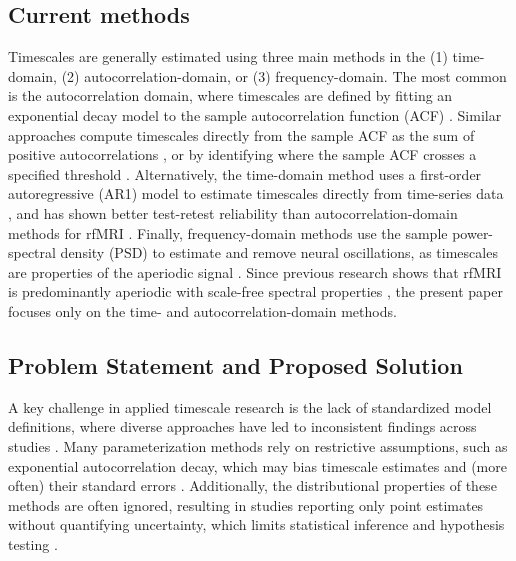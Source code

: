 \documentclass[docs/main.tex]{subfiles}
\begin{document}
\subsection{Current methods}
Timescales are generally estimated using three main methods in the (1) time-domain, (2) autocorrelation-domain, or (3) frequency-domain. The most common is the autocorrelation domain, where timescales are defined by fitting an exponential decay model to the sample autocorrelation function (ACF) \citep{rossi-pool_invariant_2021, cirillo_neural_2018, ito_cortical_2020, runyan_distinct_2017, zeraati_flexible_2022, nougaret_intrinsic_2021, wasmuht_intrinsic_2018, muller_core_2020, maisson_choice-relevant_2021, li_hierarchical_2022, shafiei_topographic_2020}. Similar approaches compute timescales directly from the sample ACF as the sum of positive autocorrelations \citep{wengler_distinct_2020, manea_intrinsic_2022, watanabe_atypical_2019}, or by identifying where the sample ACF crosses a specified threshold \citep{wengler_distinct_2020, zilio_are_2021}. Alternatively, the time-domain method uses a first-order autoregressive (AR1) model to estimate timescales directly from time-series data \citep{kaneoke_variance_2012, meisel_decline_2017, huang_timescales_2018, lurie_cortical_2024, shinn_functional_2023, shafiei_topographic_2020}, and has shown better test-retest reliability than autocorrelation-domain methods for rfMRI \citep{huang_timescales_2018}. Finally, frequency-domain methods use the sample power-spectral density (PSD) to estimate and remove neural oscillations, as timescales are properties of the aperiodic signal \citep{donoghue_parameterizing_2020, gao_neuronal_2020, manea_neural_2024, zeraati_flexible_2022, fallon_timescales_2020}. Since previous research shows that rfMRI is predominantly aperiodic with scale-free spectral properties \citep{he_temporal_2010, he_scale-free_2011}, the present paper focuses only on the time- and autocorrelation-domain methods.

\subsection{Problem Statement and Proposed Solution}
A key challenge in applied timescale research is the lack of standardized model definitions, where diverse approaches have led to inconsistent findings across studies \citep{zeraati_flexible_2022, fallon_timescales_2020, shafiei_topographic_2020}. Many parameterization methods rely on restrictive assumptions, such as exponential autocorrelation decay, which may bias timescale estimates and (more often) their standard errors \citep{woolrich_temporal_2001, zeraati_flexible_2022, raut_time_2019}. Additionally, the distributional properties of these methods are often ignored, resulting in studies reporting only point estimates without quantifying uncertainty, which limits statistical inference and hypothesis testing \citep{newey_simple_1987, white_nonlinear_1984}.\\
\end{document}
